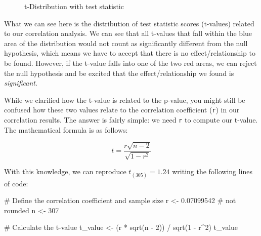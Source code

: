\documentclass[
  letterpaper,
]{krantz}
\makeatletter
\newenvironment{Shaded}{\begin{snugshade}}{\end{snugshade}}
\newcommand{\CommentTok}[1]{\textcolor[rgb]{0.37,0.37,0.37}{#1}}
\newcommand{\DecValTok}[1]{\textcolor[rgb]{0.68,0.00,0.00}{#1}}
\newcommand{\FloatTok}[1]{\textcolor[rgb]{0.68,0.00,0.00}{#1}}
\newcommand{\FunctionTok}[1]{\textcolor[rgb]{0.28,0.35,0.67}{#1}}
\newcommand{\NormalTok}[1]{\textcolor[rgb]{0.00,0.23,0.31}{#1}}
\newcommand{\OtherTok}[1]{\textcolor[rgb]{0.00,0.23,0.31}{#1}}
\newcommand{\SpecialCharTok}[1]{\textcolor[rgb]{0.37,0.37,0.37}{#1}}
\newenvironment{kframe}{%
\medskip{}
\setlength{\fboxsep}{.8em}
 \def\at@end@of@kframe{}%
 \ifinner\ifhmode%
  \def\at@end@of@kframe{\end{minipage}}%
  \begin{minipage}{\columnwidth}%
 \fi\fi%
 \def\FrameCommand##1{\hskip\@totalleftmargin \hskip-\fboxsep
 \colorbox{shadecolor}{##1}\hskip-\fboxsep
     \hskip-\linewidth \hskip-\@totalleftmargin \hskip\columnwidth}%
 \MakeFramed {\advance\hsize-\width
   \@totalleftmargin\z@ \linewidth\hsize
   \@setminipage}}%
 {\par\unskip\endMakeFramed%
 \at@end@of@kframe}
\renewenvironment{Shaded}{\begin{kframe}}{\end{kframe}}
\makeatother
\begin{document}
\begin{figure}


\caption{\label{fig-null-hypothesis-testing-plot}t-Distribution with
test statistic}

\end{figure}%

What we can see here is the distribution of test statistic scores
(t-values) related to our correlation analysis. We can see that all
t-values that fall within the blue area of the distribution would not
count as significantly different from the null hypothesis, which means
we have to accept that there is no effect/relationship to be found.
However, if the t-value falls into one of the two red areas, we can
reject the null hypothesis and be excited that the effect/relationship
we found is \emph{significant}.

While we clarified how the t-value is related to the p-value, you might
still be confused how these two values relate to the correlation
coefficient (\texttt{r}) in our correlation results. The answer is
fairly simple: we need \texttt{r} to compute our t-value. The
mathematical formula is as follows:

\[
t = \frac{r \sqrt{n - 2}}{\sqrt{1 - r^2}}
\]

With this knowledge, we can reproduce \(t_{(305)} = 1.24\) writing the
following lines of code:

\begin{Shaded}
\begin{Highlighting}[]
\CommentTok{\# Define the correlation coefficient and sample size}
\NormalTok{r }\OtherTok{\textless{}{-}} \FloatTok{0.07099542} \CommentTok{\# not rounded}
\NormalTok{n }\OtherTok{\textless{}{-}} \DecValTok{307}

\CommentTok{\# Calculate the t{-}value}
\NormalTok{t\_value }\OtherTok{\textless{}{-}}\NormalTok{ (r }\SpecialCharTok{*} \FunctionTok{sqrt}\NormalTok{(n }\SpecialCharTok{{-}} \DecValTok{2}\NormalTok{)) }\SpecialCharTok{/} \FunctionTok{sqrt}\NormalTok{(}\DecValTok{1} \SpecialCharTok{{-}}\NormalTok{ r}\SpecialCharTok{\^{}}\DecValTok{2}\NormalTok{)}
\NormalTok{t\_value}
\end{Highlighting}
\end{Shaded}
\end{document}
